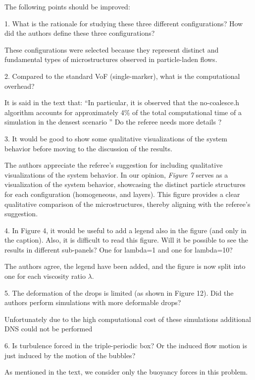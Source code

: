 \documentclass[10pt,a4paper]{article}
\newcommand{\tb}[1]{\color{blue}#1\color{black}}
\begin{document}
The following points should be improved:

1. What is the rationale for studying these three different configurations? How did the authors define these three configurations?

\tb{
    These configurations were selected because they represent distinct and fundamental types of microstructures observed in particle-laden flows. 
}

2. Compared to the standard VoF (single-marker), what is the computational overhead?

\tb{
    It is said in the text that:  
    ``In
    particular, it is observed that the no-coalesce.h algorithm accounts for approximately 4\% of the total
    computational time of a simulation in the densest scenario
    ''
    Do the referee needs more details ? 
}

3. It would be good to show some qualitative visualizations of the system behavior before moving to the discussion of the results.

\tb{
    The authors appreciate the referee's suggestion for including qualitative visualizations of the system behavior. 
    In our opinion, \textit{Figure 7} serves as a visualization of the system behavior, showcasing the distinct particle structures for each configuration (homogeneous, and layers). 
    This figure provides a clear qualitative comparison of the microstructures, thereby aligning with the referee's suggestion.
}

4. In Figure 4, it would be useful to add a legend also in the figure (and only in the caption). Also, it is difficult to read this figure. Will it be possible to see the results in different sub-panels? One for lambda=1 and one for lambda=10?

\tb{
    The authors agree, the legend have been added, and the figure is now split into one for each viscosity ratio $\lambda$. 
}

5. The deformation of the drops is limited (as shown in Figure 12). Did the authors perform simulations with more deformable drops? 

\tb{
    Unfortunately due to the high computational cost of these simulations additional DNS could not be performed
}

6. Is turbulence forced in the triple-periodic box? Or the induced flow motion is just induced by the motion of the bubbles?

\tb{
    As mentioned in the text, we consider only the buoyancy forces in this problem. 
}
\end{document}
